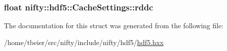 \subsubsection[{rddc}]{\setlength{\rightskip}{0pt plus 5cm}float nifty\+::hdf5\+::\+Cache\+Settings\+::rddc}\label{structnifty_1_1hdf5_1_1CacheSettings_abdcd0cbeacf12d8fa7ea533213e4366a}


The documentation for this struct was generated from the following file\+:\begin{DoxyCompactItemize}
\item 
/home/tbeier/src/nifty/include/nifty/hdf5/\hyperlink{hdf5_8hxx}{hdf5.\+hxx}\end{DoxyCompactItemize}
